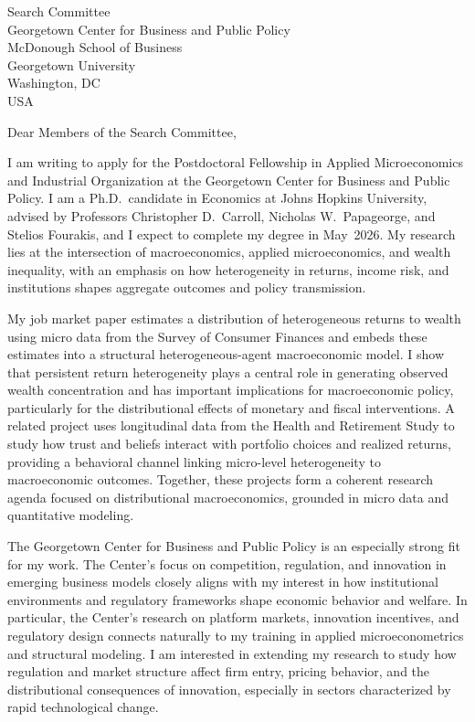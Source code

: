 \documentclass[11pt,letterpaper]{letter}
\begin{document}
\begin{letter}{Search Committee \\
Georgetown Center for Business and Public Policy \\
McDonough School of Business \\
Georgetown University \\
Washington, DC \\ USA}

\opening{Dear Members of the Search Committee,}

I am writing to apply for the Postdoctoral Fellowship in Applied Microeconomics and Industrial Organization at the Georgetown Center for Business and Public Policy. I am a Ph.D.\ candidate in Economics at Johns Hopkins University, advised by Professors Christopher D.~Carroll, Nicholas W.~Papageorge, and Stelios Fourakis, and I expect to complete my degree in May~2026. My research lies at the intersection of macroeconomics, applied microeconomics, and wealth inequality, with an emphasis on how heterogeneity in returns, income risk, and institutions shapes aggregate outcomes and policy transmission.

My job market paper estimates a distribution of heterogeneous returns to wealth using micro data from the Survey of Consumer Finances and embeds these estimates into a structural heterogeneous-agent macroeconomic model. I show that persistent return heterogeneity plays a central role in generating observed wealth concentration and has important implications for macroeconomic policy, particularly for the distributional effects of monetary and fiscal interventions. A related project uses longitudinal data from the Health and Retirement Study to study how trust and beliefs interact with portfolio choices and realized returns, providing a behavioral channel linking micro-level heterogeneity to macroeconomic outcomes. Together, these projects form a coherent research agenda focused on distributional macroeconomics, grounded in micro data and quantitative modeling.

The Georgetown Center for Business and Public Policy is an especially strong fit for my work. The Center’s focus on competition, regulation, and innovation in emerging business models closely aligns with my interest in how institutional environments and regulatory frameworks shape economic behavior and welfare. In particular, the Center’s research on platform markets, innovation incentives, and regulatory design connects naturally to my training in applied microeconometrics and structural modeling. I am interested in extending my research to study how regulation and market structure affect firm entry, pricing behavior, and the distributional consequences of innovation, especially in sectors characterized by rapid technological change.


\end{letter}
\end{document}
